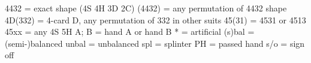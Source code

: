 4432    = exact shape (4S 4H 3D 2C)
(4432)  = any permutation of 4432 shape
4D(332) = 4-card D, any permutation of 332 in other suits
45(31)  = 4531 or 4513
45xx    = any 4S 5H
A; B    = hand A or hand B
*       = artificial
(s)bal  = (semi-)balanced
unbal   = unbalanced
spl     = splinter
PH      = passed hand
s/o     = sign off
